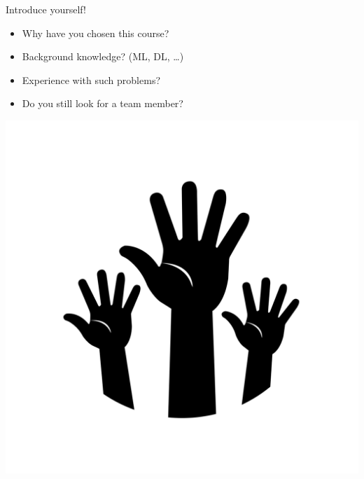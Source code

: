 \begin{frame}[c]{Introduce yourself!}

\begin{itemize}
  \item Why have you chosen this course?
  \medskip
  \item Background knowledge? (ML, DL, \ldots)
  \medskip 
  \item Experience with such problems?
  \medskip
  \item Do you still look for a team member?
\end{itemize}

\bigskip
\centering
\includegraphics[scale=0.1]{images/hands.png}

\end{frame}
% 
